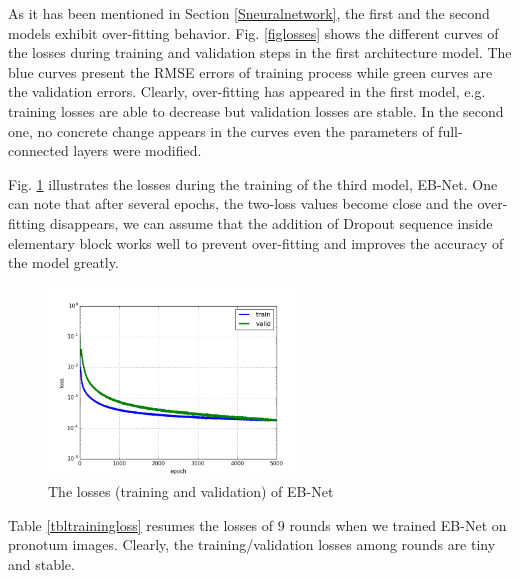 \documentclass[review]{elsarticle}
\begin{document}
As it has been mentioned in Section \ref{Sneuralnetwork}, the first
and the second models exhibit over-fitting
behavior. Fig. \ref{figlosses} shows the different curves of the
losses during training and validation steps in the first architecture model. The blue curves present
the RMSE errors of training process while green curves are the
validation errors. Clearly, over-fitting has appeared in the first
model, e.g. training losses are able to decrease but validation
losses are stable. In the second one, no concrete change appears in the curves even the parameters of full-connected layers were modified.

Fig. \ref{figloss3} illustrates the losses during the training of the
third model, EB-Net. One can note that after several epochs, the
two-loss values become close and the over-fitting disappears, we can
assume that the addition of Dropout sequence inside elementary block works well to prevent over-fitting and improves the accuracy of the model greatly.

\begin{figure}[h!]
    \centering
    \includegraphics[width=0.6\textwidth]{images/model3_loss}
    \caption{The losses (training and validation) of EB-Net}
    \label{figloss3}
\end{figure}

Table \ref{tbltrainingloss} resumes the losses of $9$ rounds when we
trained EB-Net on pronotum images. Clearly, the training/validation
losses among rounds are tiny and stable.
\end{document}
